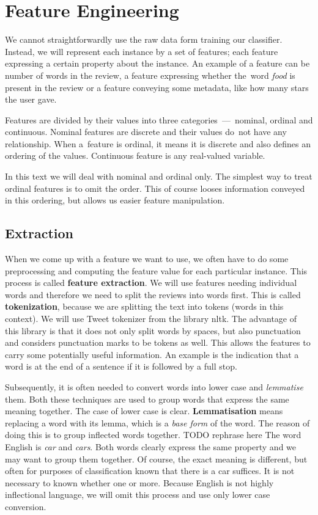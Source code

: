 \chapter{Feature Engineering}
\label{chap:fea}



We cannot straightforwardly use the raw data form training our classifier.
Instead, we will represent each instance by a set of features;
each feature expressing a certain property about the instance.
An example of a feature can be number of words in the review,
a feature expressing whether the~word {\it food} is present in the review
or a feature conveying some metadata, like how many stars the user gave.

Features are divided by their values into three categories~---~nominal, ordinal and continuous.
Nominal features are discrete and their values do~not have any relationship.
When a~feature is ordinal, it means it is discrete and also defines an ordering of the values.
Continuous feature is any real-valued variable.

In this text we will deal with nominal and ordinal only.
The simplest way to treat ordinal features is to omit the order.
This of course looses information conveyed in this ordering,
but allows us easier feature manipulation.

\section{Extraction}

When we come up with a feature we want to use,
we often have to do some preprocessing and computing the feature value for each particular instance.
This process is called {\bf feature extraction}.
We will use features needing individual words 
and therefore we need to split the reviews into words first.
This is called {\bf tokenization}, because we are splitting the text into tokens (words in this context).
We will use Tweet tokenizer from the library nltk.
The advantage of this library is that it does not only split words by spaces,
but also punctuation and considers punctuation marks to be tokens as well.
This allows the features to carry some potentially useful information.
An example is the indication that a word is at the end of a sentence if it is followed by a full stop.

Subsequently, it is often needed to convert words into lower case and {\it lemmatise} them.
Both these techniques are used to group words that express the same meaning together.
The case of lower case is clear.
{\bf Lemmatisation} means replacing a word with its lemma, which is a {\it base form} of the word.
The reason of doing this is to group inflected words together.
TODO rephrase here
The word \tin English is {\it car} and {\it cars}.
Both words clearly express the same property and we may want to group them together.
Of course, the exact meaning is different, but often for purposes of classification known that there is a car
suffices. It is not necessary to known whether one or more.
Because English is not highly inflectional language, we will omit this process and use only lower case conversion.


